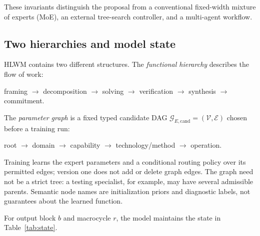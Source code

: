 \documentclass[10pt,a4paper]{article}
\newcommand{\gcand}{\mathcal{G}_{E,\mathrm{cand}}}
\newcommand{\Vcal}{\mathcal{V}}
\newcommand{\Ecal}{\mathcal{E}}
\begin{document}
These invariants distinguish the proposal from a conventional fixed-width
mixture of experts (MoE), an external tree-search controller, and a multi-agent
workflow.

\subsection{Two hierarchies and model state}

HLWM contains two different structures. The \emph{functional hierarchy}
describes the flow of work:
\begin{center}
framing $\rightarrow$ decomposition $\rightarrow$ solving $\rightarrow$
verification $\rightarrow$ synthesis $\rightarrow$ commitment.
\end{center}
The \emph{parameter graph} is a fixed typed candidate DAG
$\gcand = (\Vcal, \Ecal)$ chosen before a training run:
\begin{center}
root $\rightarrow$ domain $\rightarrow$ capability $\rightarrow$
technology/method $\rightarrow$ operation.
\end{center}

Training learns the expert parameters and a conditional routing policy over its
permitted edges; version one does not add or delete graph edges. The graph need
not be a strict tree: a testing specialist, for example, may have several
admissible parents. Semantic node names are initialization priors and
diagnostic labels, not guarantees about the learned function.

For output block $b$ and macrocycle $r$, the model maintains the state in
Table~\ref{tab:state}.
\end{document}
